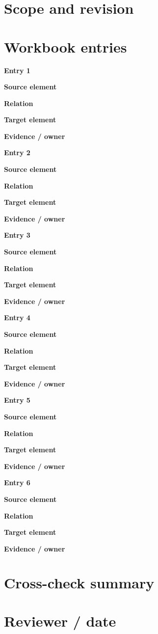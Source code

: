 \documentclass[10pt,letterpaper]{article}
\begin{document}
\DocProvenance
\section{Scope and revision}
\section{Workbook entries}
\textbf{Entry 1}\par
\textbf{Source element}\par{}
\textbf{Relation}\par{}
\textbf{Target element}\par{}
\textbf{Evidence / owner}\par{}
\textbf{Entry 2}\par
\textbf{Source element}\par{}
\textbf{Relation}\par{}
\textbf{Target element}\par{}
\textbf{Evidence / owner}\par{}
\textbf{Entry 3}\par
\textbf{Source element}\par{}
\textbf{Relation}\par{}
\textbf{Target element}\par{}
\textbf{Evidence / owner}\par{}
\textbf{Entry 4}\par
\textbf{Source element}\par{}
\textbf{Relation}\par{}
\textbf{Target element}\par{}
\textbf{Evidence / owner}\par{}
\textbf{Entry 5}\par
\textbf{Source element}\par{}
\textbf{Relation}\par{}
\textbf{Target element}\par{}
\textbf{Evidence / owner}\par{}
\textbf{Entry 6}\par
\textbf{Source element}\par{}
\textbf{Relation}\par{}
\textbf{Target element}\par{}
\textbf{Evidence / owner}\par{}
\section{Cross-check summary}
\section{Reviewer / date}
\end{document}
